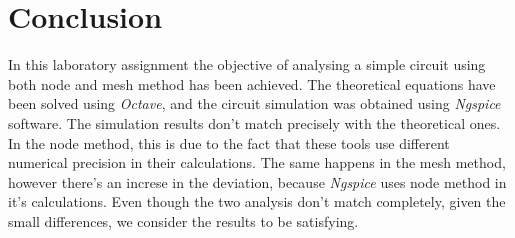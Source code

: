 \section{Conclusion}
\label{sec:conclusion}

In this laboratory assignment the objective of analysing a simple circuit using both node and mesh method has been achieved. The theoretical equations have been solved using \textit{Octave}, and the circuit simulation was obtained using \textit{Ngspice} software. The simulation results don't match precisely with the theoretical ones. In the node method, this is due to the fact that these tools use different numerical precision in their calculations. The same happens in the mesh method, however there's an increse in the deviation, because \textit{Ngspice} uses node method in it's calculations. Even though the two analysis don't match completely, given the small differences, we consider the results to be satisfying.
